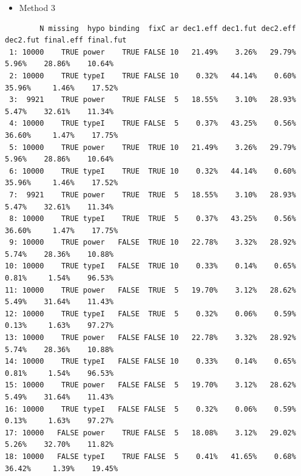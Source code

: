 \documentclass[12pt]{article}
\begin{document}
\begin{itemize}
\item Method 3
\end{itemize}
\begin{verbatim}
        N missing  hypo binding  fixC ar dec1.eff dec1.fut dec2.eff dec2.fut final.eff final.fut
 1: 10000    TRUE power    TRUE FALSE 10   21.49%    3.26%   29.79%    5.96%    28.86%    10.64%
 2: 10000    TRUE typeI    TRUE FALSE 10    0.32%   44.14%    0.60%   35.96%     1.46%    17.52%
 3:  9921    TRUE power    TRUE FALSE  5   18.55%    3.10%   28.93%    5.47%    32.61%    11.34%
 4: 10000    TRUE typeI    TRUE FALSE  5    0.37%   43.25%    0.56%   36.60%     1.47%    17.75%
 5: 10000    TRUE power    TRUE  TRUE 10   21.49%    3.26%   29.79%    5.96%    28.86%    10.64%
 6: 10000    TRUE typeI    TRUE  TRUE 10    0.32%   44.14%    0.60%   35.96%     1.46%    17.52%
 7:  9921    TRUE power    TRUE  TRUE  5   18.55%    3.10%   28.93%    5.47%    32.61%    11.34%
 8: 10000    TRUE typeI    TRUE  TRUE  5    0.37%   43.25%    0.56%   36.60%     1.47%    17.75%
 9: 10000    TRUE power   FALSE  TRUE 10   22.78%    3.32%   28.92%    5.74%    28.36%    10.88%
10: 10000    TRUE typeI   FALSE  TRUE 10    0.33%    0.14%    0.65%    0.81%     1.54%    96.53%
11: 10000    TRUE power   FALSE  TRUE  5   19.70%    3.12%   28.62%    5.49%    31.64%    11.43%
12: 10000    TRUE typeI   FALSE  TRUE  5    0.32%    0.06%    0.59%    0.13%     1.63%    97.27%
13: 10000    TRUE power   FALSE FALSE 10   22.78%    3.32%   28.92%    5.74%    28.36%    10.88%
14: 10000    TRUE typeI   FALSE FALSE 10    0.33%    0.14%    0.65%    0.81%     1.54%    96.53%
15: 10000    TRUE power   FALSE FALSE  5   19.70%    3.12%   28.62%    5.49%    31.64%    11.43%
16: 10000    TRUE typeI   FALSE FALSE  5    0.32%    0.06%    0.59%    0.13%     1.63%    97.27%
17: 10000   FALSE power    TRUE FALSE  5   18.08%    3.12%   29.02%    5.26%    32.70%    11.82%
18: 10000   FALSE typeI    TRUE FALSE  5    0.41%   41.65%    0.68%   36.42%     1.39%    19.45%
\end{verbatim}
\end{document}
